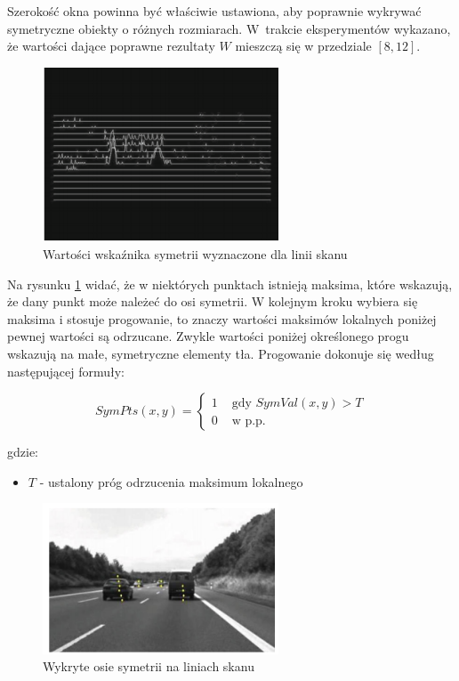 Szerokość okna powinna być właściwie ustawiona, aby poprawnie wykrywać symetryczne obiekty o różnych rozmiarach. 
W~trakcie eksperymentów wykazano, że wartości dające poprawne rezultaty $W$ mieszczą się w przedziale $[8,12]$. 

\begin{figure}
  \centering
  \includegraphics[width=7cm]{img/tl_peaks.png}
  \caption{Wartości wskaźnika symetrii wyznaczone dla linii skanu\cite{T1}}
  \label{fig:car_scan_lines}
\end{figure}

Na rysunku \ref{fig:car_scan_lines} widać, że w niektórych punktach istnieją maksima, które wskazują, że dany punkt może należeć do osi symetrii. 
W kolejnym kroku wybiera się maksima i stosuje progowanie, to znaczy wartości maksimów lokalnych poniżej pewnej wartości są odrzucane. 
Zwykle wartości poniżej określonego progu wskazują na małe, symetryczne elementy tła. 
Progowanie dokonuje się według następującej formuły:

\begin{equation}
SymPts(x,y)=\begin{cases}
1 & \text{ gdy } SymVal(x,y)>T\\ 
0 & \text{ w p.p.}
\end{cases}
\end{equation}

gdzie:
\begin{itemize}
\item $T$ - ustalony próg odrzucenia maksimum lokalnego
\end{itemize}


\begin{figure}
  \centering
  \includegraphics[width=7cm]{img/car_symmetry.png}
  \caption{Wykryte osie symetrii na liniach skanu\cite{T1}}
  \label{fig:car_detected}
\end{figure}

